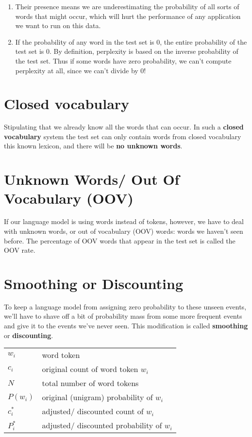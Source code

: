 \begin{enumerate}
    \item Their presence means we are underestimating the probability of all sorts of words that might occur, which will hurt the performance of any application we want to run on this data.
    \item If the probability of any word in the test set is 0, the entire probability of the test set is 0. By definition, perplexity is based on the inverse probability of the test set. Thus if some words have zero probability, we can’t compute perplexity at all, since we can’t divide by 0!
\end{enumerate}


\section{Closed vocabulary \cite{nlp-1}}

Stipulating that we already know all the words that can occur. In such a \textbf{closed vocabulary} system the test set can only contain words from closed vocabulary this known lexicon, and there will be \textbf{no unknown words}.


\section{Unknown Words/ Out Of Vocabulary (OOV) \cite{nlp-1}}

If our language model is using words instead of tokens, however, we have to deal with unknown words, or out of vocabulary (OOV) words: words we haven’t seen before. The percentage of OOV words that appear in the test set is called the OOV rate.


\section{Smoothing or Discounting \cite{nlp-1}}

To keep a language model from assigning zero probability to these unseen events, we’ll have to shave off a bit of probability mass from some more frequent events and give it to the events we’ve never seen. This modification is called \textbf{smoothing} or \textbf{discounting}.

\begin{alternateColorTable}
\renewcommand{\arraystretch}{1.3}
\begin{table}[H]
    \begin{tabular}{l l}
        $w_i$ & word token \\
        $c_i$ & original count of word token $w_i$ \\
        $N$ & total number of word tokens \\
        $P(w_i)$ & original (unigram) probability of $w_i$ \\
        $c_i^*$ & adjusted/ discounted count of $w_i$ \\
        $P_i^*$ & adjusted/ discounted probability of $w_i$ \\
    \end{tabular}
\end{table}
\renewcommand{\arraystretch}{1}
\end{alternateColorTable}


